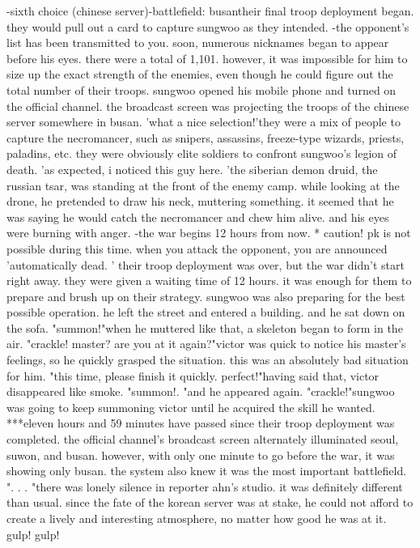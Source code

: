 -sixth choice (chinese server)-battlefield: busantheir final troop deployment began.
 they would pull out a card to capture sungwoo as they intended.
 -the opponent's list has been transmitted to you.
soon, numerous nicknames began to appear before his eyes.
 there were a total of 1,101.
however, it was impossible for him to size up the exact strength of the enemies, even though he could figure out the total number of their troops.
 sungwoo opened his mobile phone and turned on the official channel.
 the broadcast screen was projecting the troops of the chinese server somewhere in busan.
'what a nice selection!'they were a mix of people to capture the necromancer, such as snipers, assassins, freeze-type wizards, priests, paladins, etc.
 they were obviously elite soldiers to confront sungwoo's legion of death.
'as expected, i noticed this guy here.
'the siberian demon druid, the russian tsar, was standing at the front of the enemy camp.
while looking at the drone, he pretended to draw his neck, muttering something.
it seemed that he was saying he would catch the necromancer and chew him alive.
 and his eyes were burning with anger.
-the war begins 12 hours from now.
* caution! pk is not possible during this time.
 when you attack the opponent, you are announced 'automatically dead.
' their troop deployment was over, but the war didn't start right away.
 they were given a waiting time of 12 hours.
 it was enough for them to prepare and brush up on their strategy.
sungwoo was also preparing for the best possible operation.
he left the street and entered a building.
 and he sat down on the sofa.
"summon!"when he muttered like that, a skeleton began to form in the air.
"crackle! master? are you at it again?"victor was quick to notice his master's feelings, so he quickly grasped the situation.
 this was an absolutely bad situation for him.
"this time, please finish it quickly.
 perfect!"having said that, victor disappeared like smoke.
"summon!.
"and he appeared again.
"crackle!"sungwoo was going to keep summoning victor until he acquired the skill he wanted.
***eleven hours and 59 minutes have passed since their troop deployment was completed.
the official channel's broadcast screen alternately illuminated seoul, suwon, and busan.
 however, with only one minute to go before the war, it was showing only busan.
the system also knew it was the most important battlefield.
".
.
.
"there was lonely silence in reporter ahn's studio.
 it was definitely different than usual.
 since the fate of the korean server was at stake, he could not afford to create a lively and interesting atmosphere, no matter how good he was at it.
gulp! gulp!

